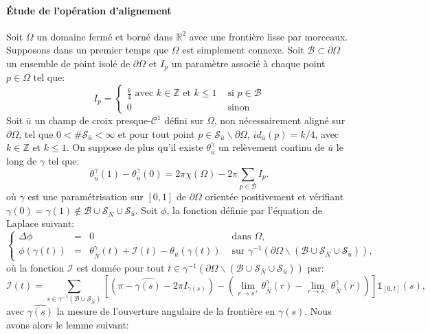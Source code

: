 \paragraph{\'Etude de l'opération d'alignement}

Soit $\Omega$ un domaine fermé et borné dans $\mathbb{R}^2$ avec une frontière lisse par morceaux. Supposons dans un premier temps que $\Omega$ est simplement connexe. Soit $\mathcal{B}\subset\partial\Omega$ un ensemble de point isolé de $\partial\Omega$ et $I_p$ un paramètre associé à chaque point $p\in\Omega$ tel que:
\begin{equation}
I_p=
\left\{
\begin{array}{ll}
\displaystyle\frac{k}{4}\mbox{ avec }k\in\mathbb{Z}\mbox{ et }k\leq 1& \mbox{ si } p\in\mathcal{B}\\[0.5cm]
0& \mbox{ sinon }
\end{array}
\right.
\label{eqn:etude_def_I}
\end{equation}
Soit $\bar{u}$ un champ de croix presque-$\mathcal{C}^1$ défini sur $\Omega$, non nécessairement aligné sur $\partial\Omega$, tel que $0<\#\mathcal{S}_{\bar{u}}<\infty$ et pour tout point $p\in\mathcal{S}_{\bar{u}}\backslash\partial\Omega$, $id_{\bar{u}}(p)=k/4$, avec $k\in\mathbb{Z}$ et $k\leq 1$. On suppose de plus qu'il existe $\theta_{\bar{u}}^\gamma$ un relèvement continu de $\bar{u}$ le long de $\gamma$ tel que:
\begin{equation}
    \label{eqn:etude_hypothese_u}
    \theta_{\bar{u}}^\gamma(1)-\theta_{\bar{u}}^\gamma(0)=2\pi\chi(\Omega)-2\pi\sum_{p\in\mathcal{B}}I_p.
\end{equation}
où $\gamma$ est une paramétrisation sur $[0, 1]$ de $\partial\Omega$ orientée positivement et vérifiant $\gamma(0)=\gamma(1)\notin\mathcal{B}\cup\mathcal{S}_{\bar{N}}\cup\mathcal{S}_{\bar{u}}$.
Soit $\phi$, la fonction définie par l'équation de Laplace suivant:
\begin{equation}
\left\{
\begin{array}{lcll}
\Delta\phi &=& 0 &\mbox{ dans }\Omega,\\[0.5cm]
\phi(\gamma(t))&=&\theta_{\bar{N}}^\gamma(t)+\mathcal{I}(t)-\theta_{\bar{u}}(\gamma(t))& \mbox{ sur } \gamma^{-1}(\partial\Omega\backslash(\mathcal{B}\cup\mathcal{S}_{\bar{N}}\cup\mathcal{S}_{\bar{u}})),
\end{array}
\right.
\label{eqn:etude_def_phi}
\end{equation}
où la fonction $\mathcal{I}$ est donnée pour tout $t\in\gamma^{-1}(\partial\Omega\backslash(\mathcal{B}\cup\mathcal{S}_{\bar{N}}\cup\mathcal{S}_{\bar{u}}))$ par:
$$
\mathcal{I}(t)=\sum_{s\in\gamma^{-1}(\mathcal{B}\cup\mathcal{S}_{\bar{N}})}\left[\left(\pi-\widehat{\gamma(s)}-2\pi I_{\gamma(s)}\right)-\left(\lim\limits_{r\rightarrow s^+}\theta^{\gamma}_{\bar{N}}(r) - \lim\limits_{r\rightarrow s^-}\theta^{\gamma}_{\bar{N}}(r)\right)\right]\mathbb{1}_{[0, t]}(s),
$$
avec $\widehat{\gamma(s)}$ la mesure de l'ouverture angulaire de la frontière en $\gamma(s)$. Nous avons alors le lemme suivant:


